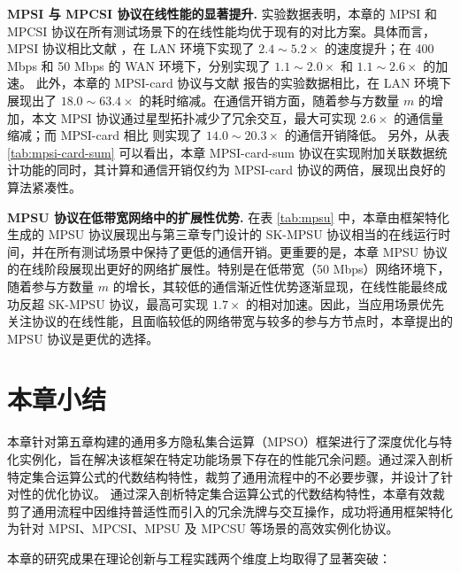 \begin{trivlist}
\item \textbf{MPSI 与 MPCSI 协议在线性能的显著提升.} 
实验数据表明，本章的 MPSI 和 MPCSI 协议在所有测试场景下的在线性能均优于现有的对比方案。具体而言，MPSI 协议相比文献 \cite{WuYC24}，在 LAN 环境下实现了 $2.4 \sim 5.2 \times$ 的速度提升；在 400 Mbps 和 50 Mbps 的 WAN 环境下，分别实现了 $1.1 \sim 2.0 \times$ 和 $1.1 \sim 2.6 \times$ 的加速。
此外，本章的 MPSI-card 协议与文献 \cite{ChenDGB22} 报告的实验数据相比，在 LAN 环境下展现出了 $18.0 \sim 63.4 \times$ 的耗时缩减。在通信开销方面，随着参与方数量 $m$ 的增加，本文 MPSI 协议通过星型拓扑减少了冗余交互，最大可实现 $2.6 \times$ 的通信量缩减；而 MPSI-card 相比 \cite{ChenDGB22} 则实现了 $14.0 \sim 20.3 \times$ 的通信开销降低。
另外，从表 \ref{tab:mpsi-card-sum} 可以看出，本章 MPSI-card-sum 协议在实现附加关联数据统计功能的同时，其计算和通信开销仅约为 MPSI-card 协议的两倍，展现出良好的算法紧凑性。

\item \textbf{MPSU 协议在低带宽网络中的扩展性优势.}
在表 \ref{tab:mpsu} 中，本章由框架特化生成的 MPSU 协议展现出与第三章专门设计的 SK-MPSU 协议相当的在线运行时间，并在所有测试场景中保持了更低的通信开销。更重要的是，本章 MPSU 协议的在线阶段展现出更好的网络扩展性。特别是在低带宽（50 Mbps）网络环境下，随着参与方数量 $m$ 的增长，其较低的通信渐近性优势逐渐显现，在线性能最终成功反超 SK-MPSU 协议，最高可实现 $1.7 \times$ 的相对加速。因此，当应用场景优先关注协议的在线性能，且面临较低的网络带宽与较多的参与方节点时，本章提出的 MPSU 协议是更优的选择。
\end{trivlist}

\section{本章小结}

本章针对第五章构建的通用多方隐私集合运算（MPSO）框架进行了深度优化与特化实例化，旨在解决该框架在特定功能场景下存在的性能冗余问题。通过深入剖析特定集合运算公式的代数结构特性，裁剪了通用流程中的不必要步骤，并设计了针对性的优化协议。
通过深入剖析特定集合运算公式的代数结构特性，本章有效裁剪了通用流程中因维持普适性而引入的冗余洗牌与交互操作，成功将通用框架特化为针对 MPSI、MPCSI、MPSU 及 MPCSU 等场景的高效实例化协议。

本章的研究成果在理论创新与工程实践两个维度上均取得了显著突破：

